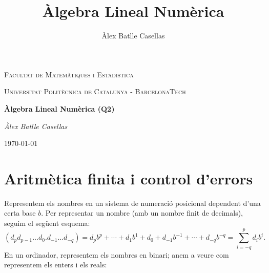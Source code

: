 \documentclass[11pt]{book}
\title{Àlgebra Lineal Numèrica}
\author{Àlex Batlle Casellas}
\begin{document}
\setcounter{section}{-1}
\begin{titlepage}
	\centering
	{\scshape\LARGE Facultat de Matemàtiques i Estadística \par}
	\vspace{1cm}
	{\scshape\Large Universitat Politècnica de Catalunya - BarcelonaTech\par}
	\vspace{1.5cm}
	{\huge\bfseries Àlgebra Lineal Numèrica (Q2)
	\par}
	\vspace{2cm}
	{\Large\itshape Àlex Batlle Casellas\par}

	\vfill

	{\large \today\par}
\end{titlepage}


\vfill
\newpage\tableofcontents
\chapter{Aritmètica finita i control d'errors}
Representem els nombres en un sistema de numeració posicional dependent d'una certa base $b$. Per representar un nombre (amb un nombre finit de decimals), seguim el següent esquema:
\[
\left(d_pd_{p-1}\ldots d_0.d_{-1}\ldots d_{-q}\right)=d_pb^p+\cdots+d_1b^1+d_0+d_{-1}b^{-1}+\cdots+d_{-q}b^{-q}=\sum_{i=-q}^pd_ib^i.
\]
En un ordinador, representem els nombres en binari; anem a veure com representem els enters i els reals:
\end{document}

